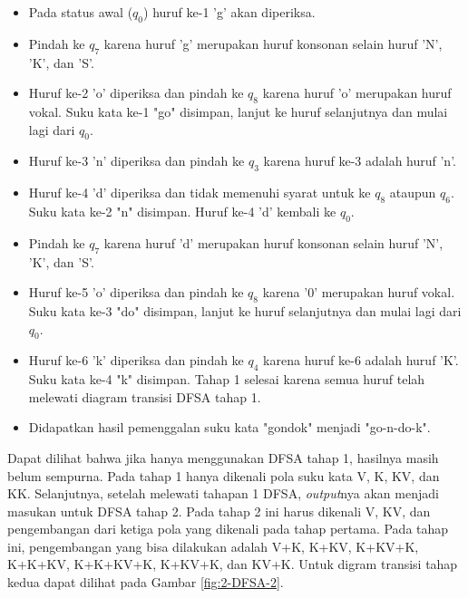 \begin{itemize}
	\item Pada status awal (\textit{$q_0$}) huruf ke-1 'g' akan diperiksa.
	\item Pindah ke \textit{$q_7$} karena huruf 'g' merupakan huruf konsonan selain huruf 'N', 'K', dan 'S'.
	\item Huruf ke-2 'o' diperiksa dan pindah ke \textit{$q_8$} karena huruf 'o' merupakan huruf vokal. Suku kata ke-1 "go" disimpan, lanjut ke huruf selanjutnya dan mulai lagi dari \textit{$q_0$}.
	\item Huruf ke-3 'n' diperiksa dan pindah ke \textit{$q_3$} karena huruf ke-3 adalah huruf 'n'.
	\item Huruf ke-4 'd' diperiksa dan tidak memenuhi syarat untuk ke \textit{$q_8$} ataupun \textit{$q_6$}. Suku kata ke-2 "n" disimpan. Huruf ke-4 'd' kembali ke \textit{$q_0$}.
	\item Pindah ke \textit{$q_7$} karena huruf 'd' merupakan huruf konsonan selain huruf 'N', 'K', dan 'S'.
	\item Huruf ke-5 'o' diperiksa dan pindah ke \textit{$q_8$} karena '0' merupakan huruf vokal. Suku kata ke-3 "do" disimpan, lanjut ke huruf selanjutnya dan mulai lagi dari \textit{$q_0$}.
	\item Huruf ke-6 'k' diperiksa dan pindah ke \textit{$q_4$} karena huruf ke-6 adalah huruf 'K'. Suku kata ke-4 "k" disimpan. Tahap 1 selesai karena semua huruf telah melewati diagram transisi DFSA tahap 1.
	\item Didapatkan hasil pemenggalan suku kata "gondok" menjadi "go-n-do-k".
\end{itemize}

Dapat dilihat bahwa jika hanya menggunakan DFSA tahap 1, hasilnya masih belum sempurna. Pada tahap 1 hanya dikenali pola suku kata V, K, KV, dan KK. Selanjutnya, setelah melewati tahapan 1 DFSA, \textit{output}nya akan menjadi masukan untuk DFSA tahap 2. Pada tahap 2 ini harus dikenali V, KV, dan pengembangan dari ketiga pola yang dikenali pada tahap pertama. Pada tahap ini, pengembangan yang bisa dilakukan adalah V+K, K+KV, K+KV+K, K+K+KV, K+K+KV+K, K+KV+K, dan KV+K. Untuk digram transisi tahap kedua dapat dilihat pada Gambar \ref{fig:2-DFSA-2}.

